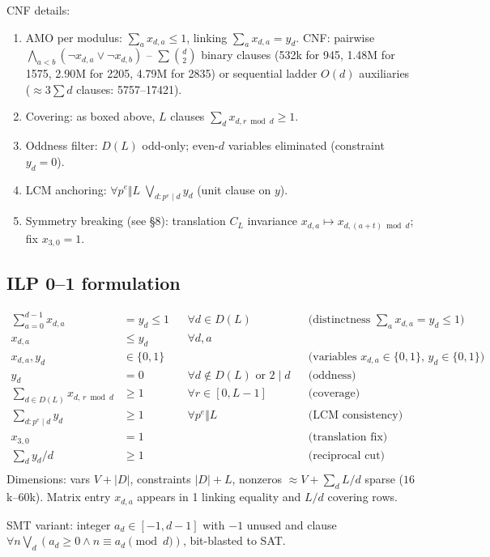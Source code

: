 \documentclass[11pt,a4paper]{article}
\theoremstyle{plain}
\theoremstyle{definition}
\theoremstyle{remark}
\begin{document}
CNF details:
\begin{enumerate}[label=(C\arabic*)]
\item AMO per modulus: $\sum_{a}x_{d,a}\le1$, linking $\sum_{a}x_{d,a}=y_{d}$. CNF: pairwise $\bigwedge_{a<b}(\neg x_{d,a}\lor\neg x_{d,b})$ -- $\sum\binom{d}{2}$ binary clauses (532k for 945, 1.48M for 1575, 2.90M for 2205, 4.79M for 2835) or sequential ladder $O(d)$ auxiliaries ($\approx3\sum d$ clauses: 5757--17421).
\item Covering: as boxed above, $L$ clauses $\sum_{d}x_{d,r\bmod d}\ge1$.
\item Oddness filter: $D(L)$ odd-only; even-$d$ variables eliminated (constraint $y_{d}=0$).
\item LCM anchoring: $\forall p^{e}\Vert L\;\bigvee_{d:p^{e}\mid d}y_{d}$ (unit clause on $y$).
\item Symmetry breaking (see \S8): translation $C_{L}$ invariance $x_{d,a}\mapsto x_{d,(a+t)\bmod d}$; fix $x_{3,0}=1$.
\end{enumerate}

\subsection{ILP 0--1 formulation}

\[
\boxed{
\begin{aligned}
\sum_{a=0}^{d-1}x_{d,a}&=y_{d}\le1 &&\forall d\in D(L) &&\text{(distinctness } \sum_{a}x_{d,a}=y_{d}\le1\text{)}\\
x_{d,a}&\le y_{d} &&\forall d,a\\
x_{d,a},y_{d}&\in\{0,1\} && &&\text{(variables }x_{d,a}\in\{0,1\},\,y_{d}\in\{0,1\}\text{)}\\
y_{d}&=0 &&\forall d\notin D(L)\text{ or }2\mid d &&\text{(oddness)}\\
\sum_{d\in D(L)}x_{d,\,r\bmod d}&\ge1 &&\forall r\in[0,L-1] &&\text{(coverage)}\\
\sum_{d:p^{e}\mid d}y_{d}&\ge1 &&\forall p^{e}\Vert L &&\text{(LCM consistency)}\\
x_{3,0}&=1 && &&\text{(translation fix)}\\
\sum_{d}y_{d}/d&\ge1 && &&\text{(reciprocal cut)}\\
\end{aligned}}
\]
Dimensions: vars $V+|D|$, constraints $|D|+L$, nonzeros $\approx V+\sum_{d}L/d$ sparse ($16$k--$60$k). Matrix entry $x_{d,a}$ appears in 1 linking equality and $L/d$ covering rows.

SMT variant: integer $a_{d}\in[-1,d-1]$ with $-1$ unused and clause $\forall n\bigvee_{d}(a_{d}\ge0\land n\equiv a_{d}\pmod d)$, bit-blasted to SAT.
\end{document}
